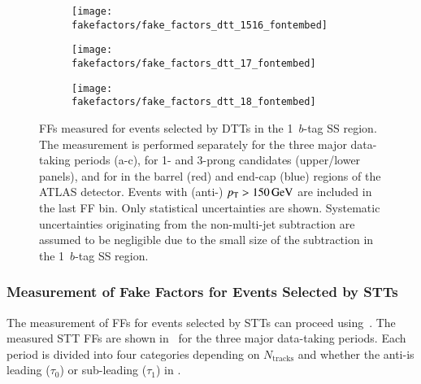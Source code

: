 \begin{figure}[htbp]
  \centering

  \begin{subfigure}{0.495\textwidth}
    \texttt{[image: fakefactors/fake\_factors\_dtt\_1516\_fontembed]}
  \end{subfigure}
  \begin{subfigure}{0.495\textwidth}
    \texttt{[image: fakefactors/fake\_factors\_dtt\_17\_fontembed]}
  \end{subfigure}

  \begin{subfigure}{0.495\textwidth}
    \texttt{[image: fakefactors/fake\_factors\_dtt\_18\_fontembed]}
  \end{subfigure}

  \caption[FFs for events selected by DTTs.]{FFs measured for events selected by
    DTTs in the 1~$b$-tag SS region. The measurement is performed separately for
    the three major data-taking periods (a-c), for 1- and 3-prong \tauhadvis
    candidates (upper/lower panels), and for \tauhadvis in the barrel (red) and
    end-cap (blue) regions of the ATLAS detector. Events with (anti-)\tauhadvis
    $p_{\text{T}} > \SI{150}{\ensuremath{\text{GeV}}}$ are included in the last FF bin. Only statistical
    uncertainties are shown. Systematic uncertainties originating from the
    non-multi-jet subtraction are assumed to be negligible due to the small size
    of the subtraction in the 1~$b$-tag SS region.}%
  \label{fig:mjfakes_fake_factors}
\end{figure}


\subsubsection{Measurement of Fake Factors for Events Selected by STTs}

The measurement of FFs for events selected by STTs can proceed
using~. The measured STT FFs are shown
in~ for the three major data-taking periods. Each
period is divided into four categories depending on $N_{\text{tracks}}$ and
whether the anti-\tauhadvis is leading ($\tau_0$) or sub-leading ($\tau_1$) in
\pT.


